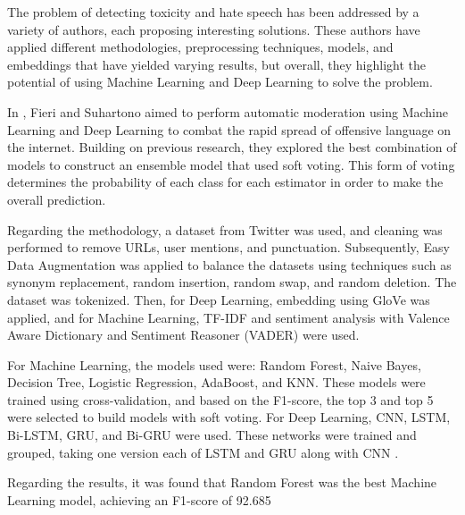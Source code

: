 
The problem of detecting toxicity and hate speech has been addressed by a variety of authors, each proposing interesting solutions. These authors have applied different methodologies, preprocessing techniques, models, and embeddings that have yielded varying results, but overall, they highlight the potential of using Machine Learning and Deep Learning to solve the problem.

In \cite{fieri2023softvoting}, Fieri and Suhartono aimed to perform automatic moderation using Machine Learning and Deep Learning to combat the rapid spread of offensive language on the internet. Building on previous research, they explored the best combination of models to construct an ensemble model that used soft voting. This form of voting determines the probability of each class for each estimator in order to make the overall prediction.

Regarding the methodology, a dataset from Twitter was used, and cleaning was performed to remove URLs, user mentions, and punctuation. Subsequently, Easy Data Augmentation was applied to balance the datasets using techniques such as synonym replacement, random insertion, random swap, and random deletion. The dataset was tokenized. Then, for Deep Learning, embedding using GloVe was applied, and for Machine Learning, TF-IDF and sentiment analysis with Valence Aware Dictionary and Sentiment Reasoner (VADER) were used.

For Machine Learning, the models used were: Random Forest, Naive Bayes, Decision Tree, Logistic Regression, AdaBoost, and KNN. These models were trained using cross-validation, and based on the F1-score, the top 3 and top 5 were selected to build models with soft voting. For Deep Learning, CNN, LSTM, Bi-LSTM, GRU, and Bi-GRU were used. These networks were trained and grouped, taking one version each of LSTM and GRU along with CNN \cite{comparison2023toxic}.

Regarding the results, it was found that Random Forest was the best Machine Learning model, achieving an F1-score of 92.685%

